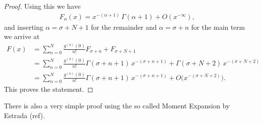 \begin{theorem}
\begin{proof}
        Using this we have
        \begin{align*}
            F_\alpha(x) = x^{-(\alpha+1)}\,\Gamma(\alpha + 1) + O(x^{-\infty}),
        \end{align*}
        and inserting $\alpha = \sigma + N + 1$ for the remainder and $\alpha =
        \sigma + n$ for the main term we arrive at
        \begin{align*}
            F(x) &= \sum_{n=0}^N \frac{g^{(n)}(0)}{n!} F_{\sigma+n} + F_{\sigma +
            N + 1} \\
            &= \sum_{n=0}^N \frac{g^{(n)}(0)}{n!}
                 \Gamma(\sigma + n +1)\,x^{-(\sigma + n + 1)} + \Gamma(\sigma +
                 N + 2)\,x^{-(\sigma + N + 2)} \\
            &= \sum_{n=0}^N \frac{g^{(n)}(0)}{n!}\Gamma(\sigma + n +
            1)\,x^{-(\sigma + n + 1)} + O\bigl(x^{-(\sigma + N + 2)}\bigr).
        \end{align*}
        This proves the statement.
    \end{proof}
    \begin{remark}
        There is also a very simple proof using the so called Moment Expansion
        by Estrada (ref).
    \end{remark}
\end{theorem}
